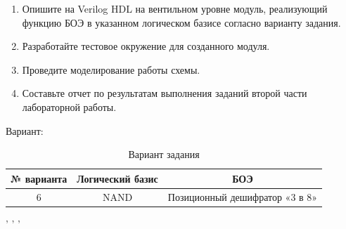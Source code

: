 \begin{enumerate}
    \item Опишите на Verilog HDL на вентильном уровне модуль, реализующий функцию БОЭ в указанном логическом базисе согласно варианту задания.
    \item Разработайте тестовое окружение для созданного модуля.
    \item Проведите моделирование работы схемы.
    \item Составьте отчет по результатам выполнения заданий второй части лабораторной работы.
\end{enumerate}

Вариант:  
\begin{table}[htb]
    \centering
    \begin{tabular}{|c|c|c|}\hline
        №  варианта & Логический базис  & БОЭ \\\hline
        6           & NAND              & Позиционный дешифратор «3 в 8»\\\hline
    \end{tabular}
    \caption{Вариант задания}
    \label{tab:variant}
\end{table}



\begin{center} ' ' ' \end{center}

